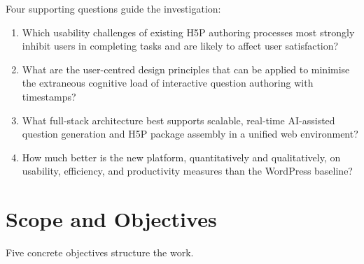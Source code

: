 Four supporting questions guide the investigation:

\begin{enumerate}[label=RQ\arabic*.]
  \item Which usability challenges of existing H5P authoring processes most strongly inhibit users in completing tasks and are likely to affect user satisfaction?
  \item What are the user-centred design principles that can be applied to minimise the extraneous cognitive load of interactive question authoring with timestamps?
  \item What full-stack architecture best supports scalable, real-time AI-assisted question generation and H5P package assembly in a unified web environment?
  \item How much better is the new platform, quantitatively and qualitatively, on usability, efficiency, and productivity measures than the WordPress baseline?
\end{enumerate}

\section{Scope and Objectives}

Five concrete objectives structure the work.


